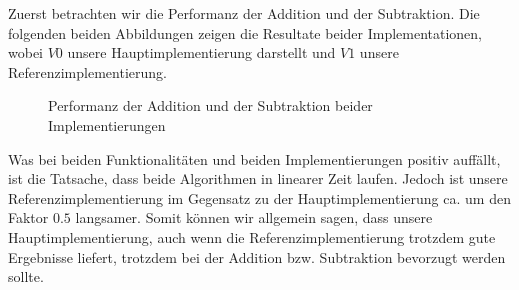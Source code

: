 \documentclass[course=erap]{aspdoc}
\begin{document}
    Zuerst betrachten wir die Performanz der Addition und der Subtraktion. Die folgenden beiden Abbildungen
    zeigen die Resultate beider Implementationen, wobei $V0$ unsere Hauptimplementierung darstellt und $V1$ unsere
    Referenzimplementierung. \\


    \begin{figure}[ht]
        \captionsetup{justification=centering}
        \caption{Performanz der Addition und der Subtraktion beider Implementierungen}
    \end{figure}

    Was bei beiden Funktionalitäten und beiden Implementierungen positiv auffällt, ist die Tatsache,
    dass beide Algorithmen in linearer Zeit laufen. Jedoch ist unsere Referenzimplementierung im Gegensatz zu der
    Hauptimplementierung ca. um den Faktor $0.5$ langsamer. Somit können wir allgemein sagen, dass unsere Hauptimplementierung,
    auch wenn die Referenzimplementierung trotzdem gute Ergebnisse liefert, trotzdem bei der Addition bzw. Subtraktion bevorzugt werden
    sollte.
\end{document}
